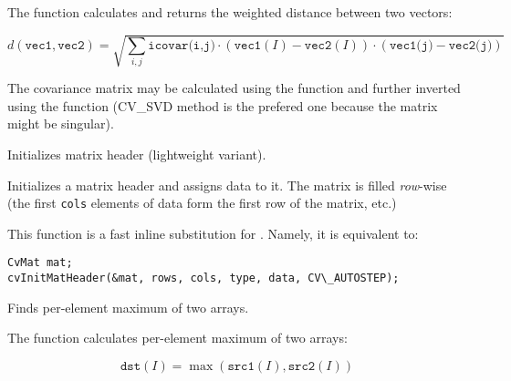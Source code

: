 The function calculates and returns the weighted distance between two vectors:

\[
d(\texttt{vec1},\texttt{vec2})=\sqrt{\sum_{i,j}{\texttt{icovar(i,j)}\cdot(\texttt{vec1}(I)-\texttt{vec2}(I))\cdot(\texttt{vec1(j)}-\texttt{vec2(j)})}}
\]

The covariance matrix may be calculated using the  function and further inverted using the  function (CV\_SVD method is the prefered one because the matrix might be singular).


\ifC
{}
Initializes matrix header (lightweight variant).


\begin{description}
\end{description}

Initializes a matrix header and assigns data to it. The matrix is filled \textit{row}-wise (the first \texttt{cols} elements of data form the first row of the matrix, etc.)

This function is a fast inline substitution for . Namely, it is equivalent to:

\begin{lstlisting}
CvMat mat;
cvInitMatHeader(&mat, rows, cols, type, data, CV\_AUTOSTEP);
\end{lstlisting}
\fi

Finds per-element maximum of two arrays.


\begin{description}
\end{description}

The function calculates per-element maximum of two arrays:

\[
\texttt{dst}(I)=\max(\texttt{src1}(I), \texttt{src2}(I))
\]

